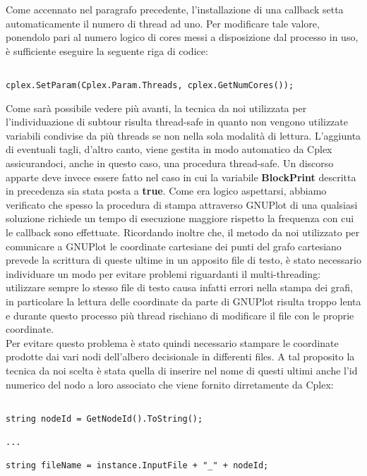 \documentclass[11pt]{article}
\begin{document}
Come accennato nel paragrafo precedente, l'installazione di una callback setta automaticamente il numero di thread ad uno. Per modificare tale valore, ponendolo pari al numero logico di cores messi a disposizione dal processo in uso, è sufficiente eseguire la seguente riga di codice:

\begin{lstlisting}

cplex.SetParam(Cplex.Param.Threads, cplex.GetNumCores());

\end{lstlisting}

Come sarà possibile vedere più avanti, la tecnica da noi utilizzata per l'individuazione di subtour risulta thread-safe in quanto non vengono utilizzate variabili condivise da più threads se non nella sola modalità di lettura. L'aggiunta di eventuali tagli, d'altro canto, viene gestita in modo automatico da Cplex assicurandoci, anche in questo caso, una procedura thread-safe. Un discorso apparte deve invece essere fatto nel caso in cui la variabile \textbf{BlockPrint} descritta in precedenza sia stata posta a \textbf{true}. Come era logico aspettarsi, abbiamo verificato che spesso la procedura di stampa attraverso GNUPlot di una qualsiasi soluzione richiede un tempo di esecuzione maggiore rispetto la frequenza con cui le callback sono effettuate. Ricordando inoltre che, il metodo da noi utilizzato per comunicare a GNUPlot le coordinate cartesiane dei punti del grafo cartesiano prevede la scrittura di queste ultime in un apposito file di testo, è stato necessario individuare un modo per evitare problemi riguardanti il multi-threading: utilizzare sempre lo stesso file di testo causa infatti errori nella stampa dei grafi, in particolare la lettura delle coordinate da parte di GNUPlot risulta troppo lenta e durante questo processo più thread rischiano di modificare il file con le proprie coordinate.\\
Per evitare questo problema è stato quindi necessario stampare le coordinate prodotte dai vari nodi dell'albero decisionale in differenti files. A tal proposito la tecnica da noi scelta è stata quella di inserire nel nome di questi ultimi anche l'id numerico del nodo a loro associato che viene fornito dirretamente da Cplex:


\begin{lstlisting}

string nodeId = GetNodeId().ToString();

...

string fileName = instance.InputFile + "_" + nodeId;

\end{lstlisting}
\end{document}
